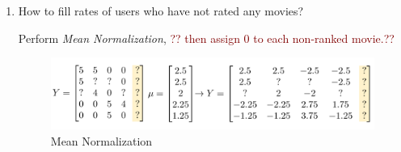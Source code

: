 \documentclass[12pt]{article}
\newenvironment{QandA}{\begin{enumerate}[label=\bfseries\arabic*.]\bfseries}
{\end{enumerate}}
\newenvironment{answered}{\par\normalfont\color{Sepia}}{}
\begin{document}
\begin{QandA}
\begin{answered}
\begin{itemize}
            \item \textbf{Content-based recommenders}

            \textbf{Advantages}
                \begin{itemize}
                    \item Works even when a product has no user reviews
                \end{itemize}

            \textbf{Disadvantages}
                \begin{itemize}
                    \item Needs descriptive data for every product that you want to recommend
                    \item Difficult to implement for many kinds of large product databases
                \end{itemize}
        \end{itemize}
    \end{answered}
    
    \item How to fill rates of users who have not rated any movies?
    \begin{answered}
        Perform \textit{Mean Normalization}, \textcolor{Maroon}{?? then assign 0 to each non-ranked movie.??}
        \begin{figure}[h!]
            \centering
            \includegraphics[width=\textwidth]{mean_normalization.png}
            \caption{Mean Normalization}
            \label{fig:normalization}
        \end{figure}

    \end{answered}

\end{QandA}
\end{document}

